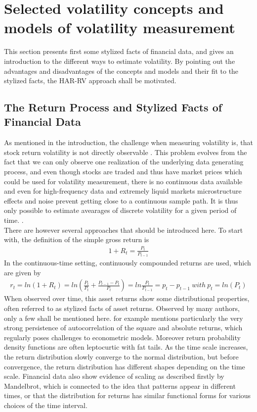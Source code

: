 
\section{Selected volatility concepts and models of volatility measurement}
This section presents first some stylized facts of financial data, and gives an introduction to the different ways to estimate volatility. By pointing out the advantages and disadvantages of the concepts and models and their fit to the stylized facts, the HAR-RV approach shall be motivated. 


\subsection{The Return Process and Stylized Facts of Financial Data}
As mentioned in the introduction, the challenge when measuring volatility is, that stock return volatility is not directly observable \parencite{tsay2005}. This problem evolves from the fact that we can only observe one realization of the underlying data generating process, and even though stocks are traded and thus have market prices which could be used for volatility measurement, there is no continuous data available and even for high-frequency data and extremely liquid markets microstructure effects and noise prevent getting close to a continuous sample path. It is thus only possible to estimate avearages of discrete volatility for a given period of time. \parencite{andersen2001}.\\
There are however several approaches that should be introduced here. To start with, the definition of the simple gross return is
\begin{align}\label{eq:return}
1+ R_{t} = \frac{P_{t}}{P_{t-1}} 
\end{align}
In the continuous-time setting, continuously compounded returns are used, which are given by
\begin{align}\label{eq:log-return}
r_{t} = ln(1 + R_{t}) = ln (\frac{P_{t}}{P_{t}} + \frac{P_{t-1} - P_{t}}{P_{t}}) = 
ln \frac{P_{t}}{P_{t-1}} = p_{t} - p_{t-1} \ 
with\  p_{t} = ln(P_{t})
\end{align}
When observed over time, this asset returns show some distributional properties, often referred to as stylized facts of asset returns. Observed by many authors, only a few shall be mentioned here. \citeauthor{corsi2009} for example mentions particularly the very strong persistence of autocorrelation of the square and absolute returns, which regularly poses challenges to econometric models. Moreover return probability density functions are often leptocurtic with fat tails. As the time scale increases, the return distribution slowly converge to the normal distribution, but before convergence, the return distribution has different shapes depending on the time scale. Financial data also show evidence of scaling as described firstly by Mandelbrot, which is connected to the idea that patterns appear in different times, or that the distribution for returns has similar functional forms for various choices of the time interval. \\
